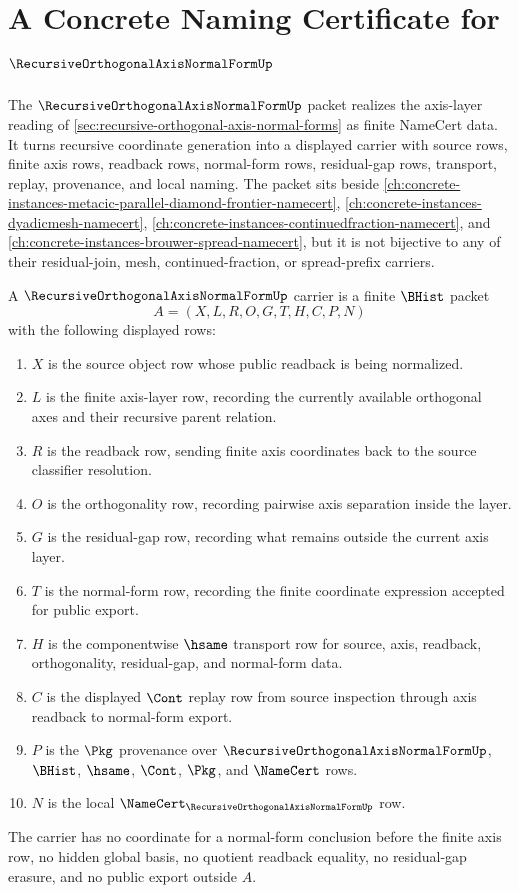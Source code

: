 \chapter{A Concrete Naming Certificate for $\RecursiveOrthogonalAxisNormalFormUp$}
\label{ch:concrete-instances-recursive-orthogonal-axis-normal-form-namecert}

The $\RecursiveOrthogonalAxisNormalFormUp$ packet realizes the axis-layer reading of \autoref{sec:recursive-orthogonal-axis-normal-forms} as finite NameCert data. It turns recursive coordinate generation into a displayed carrier with source rows, finite axis rows, readback rows, normal-form rows, residual-gap rows, transport, replay, provenance, and local naming. The packet sits beside \autoref{ch:concrete-instances-metacic-parallel-diamond-frontier-namecert}, \autoref{ch:concrete-instances-dyadicmesh-namecert}, \autoref{ch:concrete-instances-continuedfraction-namecert}, and \autoref{ch:concrete-instances-brouwer-spread-namecert}, but it is not bijective to any of their residual-join, mesh, continued-fraction, or spread-prefix carriers.

\begin{definition}
\label{def:recursive-orthogonal-axis-normal-form-carrier}
A $\RecursiveOrthogonalAxisNormalFormUp$ carrier is a finite $\BHist$ packet
$$
A=(X,L,R,O,G,T,H,C,P,N)
$$
with the following displayed rows:
\begin{enumerate}
\item $X$ is the source object row whose public readback is being normalized.
\item $L$ is the finite axis-layer row, recording the currently available orthogonal axes and their recursive parent relation.
\item $R$ is the readback row, sending finite axis coordinates back to the source classifier resolution.
\item $O$ is the orthogonality row, recording pairwise axis separation inside the layer.
\item $G$ is the residual-gap row, recording what remains outside the current axis layer.
\item $T$ is the normal-form row, recording the finite coordinate expression accepted for public export.
\item $H$ is the componentwise $\hsame$ transport row for source, axis, readback, orthogonality, residual-gap, and normal-form data.
\item $C$ is the displayed $\Cont$ replay row from source inspection through axis readback to normal-form export.
\item $P$ is the $\Pkg$ provenance over $\RecursiveOrthogonalAxisNormalFormUp$, $\BHist$, $\hsame$, $\Cont$, $\Pkg$, and $\NameCert$ rows.
\item $N$ is the local $\NameCert_{\RecursiveOrthogonalAxisNormalFormUp}$ row.
\end{enumerate}
The carrier has no coordinate for a normal-form conclusion before the finite axis row, no hidden global basis, no quotient readback equality, no residual-gap erasure, and no public export outside $A$.
\end{definition}

